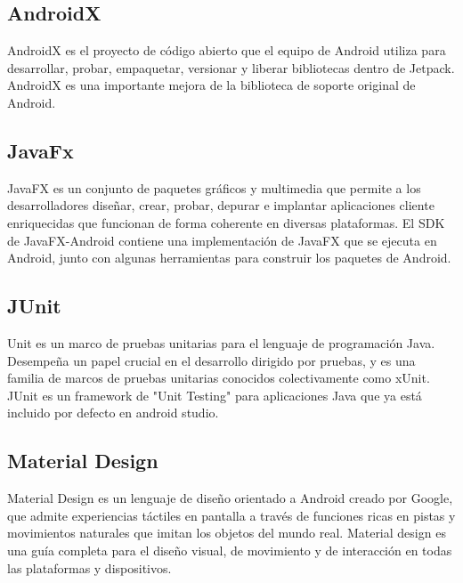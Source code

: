 \subsection{AndroidX}

AndroidX es el proyecto de código abierto que el equipo de Android utiliza para desarrollar, probar, empaquetar, versionar y liberar bibliotecas dentro de Jetpack. AndroidX es una importante mejora de la biblioteca de soporte original de Android.

\subsection{JavaFx}

JavaFX es un conjunto de paquetes gráficos y multimedia que permite a los desarrolladores diseñar, crear, probar, depurar e implantar aplicaciones cliente enriquecidas que funcionan de forma coherente en diversas plataformas. El SDK de JavaFX-Android contiene una implementación de JavaFX que se ejecuta en Android, junto con algunas herramientas para construir los paquetes de Android.

\subsection{JUnit}

Unit es un marco de pruebas unitarias para el lenguaje de programación Java. Desempeña un papel crucial en el desarrollo dirigido por pruebas, y es una familia de marcos de pruebas unitarias conocidos colectivamente como xUnit. JUnit es un framework de "Unit Testing" para aplicaciones Java que ya está incluido por defecto en android studio.

\subsection{Material Design}

Material Design es un lenguaje de diseño orientado a Android creado por Google, que admite experiencias táctiles en pantalla a través de funciones ricas en pistas y movimientos naturales que imitan los objetos del mundo real. Material design es una guía completa para el diseño visual, de movimiento y de interacción en todas las plataformas y dispositivos.


